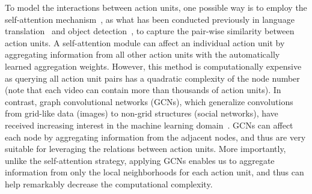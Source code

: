 \documentclass[10pt,journal,compsoc]{IEEEtran}
\begin{document}
	To model the interactions between action units, one possible way is to employ the self-attention mechanism~\cite{vaswani2017attention}, as what has been conducted previously in language translation~\cite{vaswani2017attention} and object detection~\cite{hu2018relation}, to capture the pair-wise similarity between action units. 
	A self-attention module can affect an individual action unit by aggregating information from all other action units with the automatically learned aggregation weights.
	However, this method is computationally expensive as querying all action unit pairs has a quadratic complexity of the node number (note that each video can contain more than thousands of action units). In contrast, graph convolutional networks (GCNs), which generalize convolutions from grid-like data (\eg images) to non-grid structures (\eg social networks), have received increasing interest in the machine learning domain~\cite{kipf2017semi,yan2018spatial}. GCNs can affect each node by aggregating information from the adjacent nodes, and thus are very suitable for leveraging the relations between action units. More importantly, 
	unlike the self-attention strategy, 
	applying GCNs enables us to aggregate information from only the local neighborhoods for each action unit, and thus can help remarkably decrease the computational complexity.
	
\end{document}
